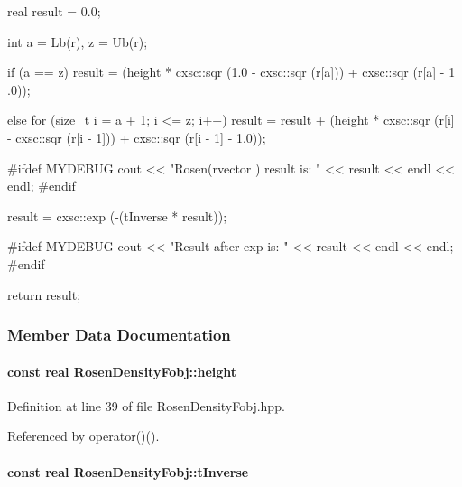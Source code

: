 \begin{DoxyCode}
{   
  real result = 0.0;
   
    int a = Lb(r), z = Ub(r);
  
  if (a == z)
  {
    result = (height * cxsc::sqr (1.0 - cxsc::sqr (r[a])) + cxsc::sqr (r[a] - 1
      .0));
  }
   
  else {
    for (size_t i = a + 1; i <= z; i++) {
      result = result + (height * cxsc::sqr (r[i] - cxsc::sqr (r[i - 1])) +
              cxsc::sqr (r[i - 1] - 1.0));
    }
  }
  
  #ifdef MYDEBUG
    cout << "Rosen(rvector ) result is: " << result << endl << endl; 
  #endif
  
  result = cxsc::exp (-(tInverse * result));

  #ifdef MYDEBUG
    cout << "Result after exp is: " << result << endl << endl; 
  #endif


   return result;
}
\end{DoxyCode}


\subsubsection{\-Member \-Data \-Documentation}
\hypertarget{classRosenDensityFobj_a56ff0d36a15509cbbb0cf1182c90f675}{
\paragraph[{height}]{\setlength{\rightskip}{0pt plus 5cm}const real {\bf \-Rosen\-Density\-Fobj\-::height}}}\label{classRosenDensityFobj_a56ff0d36a15509cbbb0cf1182c90f675}


\-Definition at line 39 of file \-Rosen\-Density\-Fobj.\-hpp.



\-Referenced by operator()().

\hypertarget{classRosenDensityFobj_a9c10e3721ba9e7534d20a22af31cbc2a}{
\paragraph[{t\-Inverse}]{\setlength{\rightskip}{0pt plus 5cm}const real {\bf \-Rosen\-Density\-Fobj\-::t\-Inverse}}}\label{classRosenDensityFobj_a9c10e3721ba9e7534d20a22af31cbc2a}


